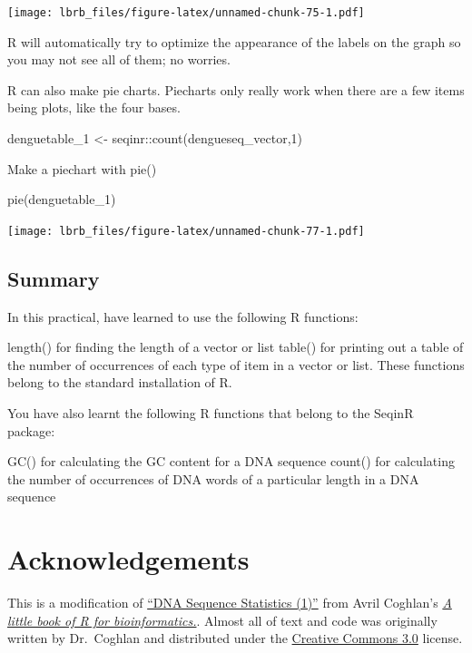 \documentclass[
]{book}
\newenvironment{Shaded}{\begin{snugshade}}{\end{snugshade}}
\newcommand{\DecValTok}[1]{\textcolor[rgb]{0.00,0.00,0.81}{#1}}
\newcommand{\FunctionTok}[1]{\textcolor[rgb]{0.00,0.00,0.00}{#1}}
\newcommand{\NormalTok}[1]{#1}
\newcommand{\OtherTok}[1]{\textcolor[rgb]{0.56,0.35,0.01}{#1}}
\newcommand{\SpecialCharTok}[1]{\textcolor[rgb]{0.00,0.00,0.00}{#1}}
\begin{document}
\texttt{[image: lbrb\_files/figure-latex/unnamed-chunk-75-1.pdf]}

R will automatically try to optimize the appearance of the labels on the graph so you may not see all of them; no worries.

R can also make pie charts. Piecharts only really work when there are a few items being plots, like the four bases.

\begin{Shaded}
\begin{Highlighting}[]
\NormalTok{denguetable\_1 }\OtherTok{\textless{}{-}}\NormalTok{ seqinr}\SpecialCharTok{::}\FunctionTok{count}\NormalTok{(dengueseq\_vector,}\DecValTok{1}\NormalTok{)}
\end{Highlighting}
\end{Shaded}

Make a piechart with pie()

\begin{Shaded}
\begin{Highlighting}[]
\FunctionTok{pie}\NormalTok{(denguetable\_1)}
\end{Highlighting}
\end{Shaded}

\texttt{[image: lbrb\_files/figure-latex/unnamed-chunk-77-1.pdf]}

\hypertarget{summary}{%
\subsection{Summary}\label{summary}}

In this practical, have learned to use the following R functions:

length() for finding the length of a vector or list
table() for printing out a table of the number of occurrences of each type of item in a vector or list.
These functions belong to the standard installation of R.

You have also learnt the following R functions that belong to the SeqinR package:

GC() for calculating the GC content for a DNA sequence
count() for calculating the number of occurrences of DNA words of a particular length in a DNA sequence

\hypertarget{acknowledgements}{%
\section{Acknowledgements}\label{acknowledgements}}

This is a modification of \href{https://a-little-book-of-r-for-bioinformatics.readthedocs.io/en/latest/src/chapter1.html}{``DNA Sequence Statistics (1)''} from Avril Coghlan's \href{https://a-little-book-of-r-for-bioinformatics.readthedocs.io/en/latest/index.html}{\emph{A little book of R for bioinformatics.}}. Almost all of text and code was originally written by Dr.~Coghlan and distributed under the \href{https://creativecommons.org/licenses/by/3.0/us/}{Creative Commons 3.0} license.
\end{document}
